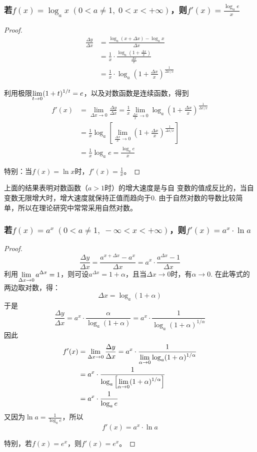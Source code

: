 \subsubsection{若$f(x)=\log_a x\; (0<a\ne 1,\; 0<x<+\infty)$，则$f'(x)=\frac{\log_a e}{x}$}

\begin{proof}
\[\begin{split}
    \frac{\Delta y}{\Delta x}&=\frac{\log_a(x+\Delta x)-\log_a x}{\Delta x}\\
    &=\frac{1}{x}\cdot \frac{\log_a\left(1+\frac{\Delta x}{x}\right)}{\frac{\Delta x}{x}}\\
    &=\frac{1}{x}\cdot \log_a\left(1+\frac{\Delta x}{x}\right)^{\tfrac{1}{\Delta x/x}}
\end{split}\]  

利用极限$\displaystyle\lim_{t\to 0}(1+t)^{1/t}=e$，以及对数函数是连续函数，得到
\[\begin{split}
    f'(x)&=\lim_{\Delta x\to 0}\frac{\Delta y}{\Delta x}=\frac{1}{x}\lim_{\tfrac{\Delta x}{x}\to 0}\log_a\left(1+\frac{\Delta x}{x}\right)^{\tfrac{1}{\Delta x/x}}\\
    &=\frac{1}{x}\log_a\left[\lim_{\tfrac{\Delta x}{x}\to 0}\left(1+\frac{\Delta x}{x}\right)^{\tfrac{1}{\Delta x/x}}\right]\\
    &=\frac{1}{x}\log_a e=\frac{\log_a e}{x}
\end{split}\]

特别：当$f(x)=\ln x$时，$f'(x)=\frac{1}{x}$。
\end{proof}

上面的结果表明对数函数（$a>1$时）的增大速度是与自
变数的值成反比的，当自变数无限增大时，增大速度就保持正值而趋向于0. 由于自然对数的导数比较简单，所以在理论研究中常常采用自然对数。

\subsubsection{若$f(x)=a^x\; (0<a\ne 1,\; -\infty<x<+\infty)$，则$f'(x)=a^x\cdot \ln a$}

\begin{proof}
    \[\frac{\Delta y}{\Delta x}=\frac{a^{x+\Delta x}-a^x}{\Delta x}=a^x\cdot \frac{a^{\Delta x}-1}{\Delta x}\]
利用$\displaystyle\lim_{\Delta x\to 0}a^{\Delta x}=1$，则可设$a^{\Delta x}=1+\alpha$，且当$\Delta x\to 0$时，有$\alpha\to 0$. 在此等式的两边取对数，得：
\[\Delta x=\log_a(1+\alpha)\]
于是
\[\frac{\Delta y}{\Delta x}=a^x\cdot \frac{\alpha}{\log_a(1+\alpha)}=a^x\cdot \frac{1}{\log_a(1+\alpha)^{1/\alpha}}\]
因此
\[\begin{split}
    f'(x)&=\lim_{\Delta x\to 0}\dfrac{\Delta y}{\Delta x}=a^x\cdot \dfrac{1}{\displaystyle\lim_{\alpha\to 0}\log_a(1+\alpha)^{1/\alpha}}\\
    &=a^x\cdot \dfrac{1}{\log_a\left[\displaystyle\lim_{\alpha\to 0}(1+\alpha)^{1/\alpha}\right]}\\
    &=a^x\cdot \dfrac{1}{\log_a e}
\end{split}\]
又因为$\ln a=\frac{1}{\log_a e}$，所以
\[f'(x)=a^x\cdot \ln a\]

特别，若$f(x)=e^x$，则$f'(x)=e^x$。
\end{proof}

